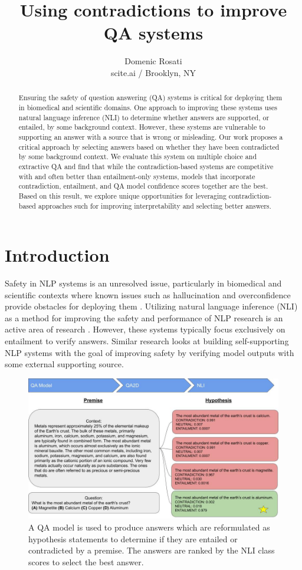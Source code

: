 \documentclass[11pt]{article}
\title{Using contradictions to improve QA systems}
\author{Domenic Rosati \\
  scite.ai / Brooklyn, NY}
\begin{document}
\maketitle
\begin{abstract}
Ensuring the safety of question answering (QA) systems is critical for deploying them in biomedical and scientific domains. One approach to improving these systems uses natural language inference (NLI) to determine whether answers are supported, or entailed, by some background context. However, these systems are vulnerable to supporting an answer with a source that is wrong or misleading. Our work proposes a critical approach by selecting answers based on whether they have been contradicted by some background context. We evaluate this system on multiple choice and extractive QA and find that while the contradiction-based systems are competitive with and often better than entailment-only systems, models that incorporate contradiction, entailment, and QA model confidence scores together are the best. Based on this result, we explore unique opportunities for leveraging contradiction-based approaches such for improving interpretability and selecting better answers.
\end{abstract}
\section{Introduction}
Safety in NLP systems is an unresolved issue, particularly in biomedical and scientific contexts where known issues such as hallucination and overconfidence provide obstacles for deploying them \citep{ji_survey_2022,kell_what_2021}. Utilizing natural language inference (NLI) as a method for improving the safety and performance of NLP research is an active area of research \citep{li_faithfulness_2022}. However, these systems typically focus exclusively on entailment to verify answers. Similar research looks at building self-supporting NLP systems \citep{nakano_webgpt_2022, menick_teaching_2022} with the goal of improving safety by verifying model outputs with some external supporting source.
\begin{figure}
    \centering
  \includegraphics[width=1.0\linewidth]{arch.jpg}
  \caption{A QA model is used to produce answers which are reformulated as hypothesis statements to determine if they are entailed or contradicted by a premise. The answers are ranked by the NLI class scores to select the best answer.}
  \label{fig:architecture}
\end{figure}
\end{document}
